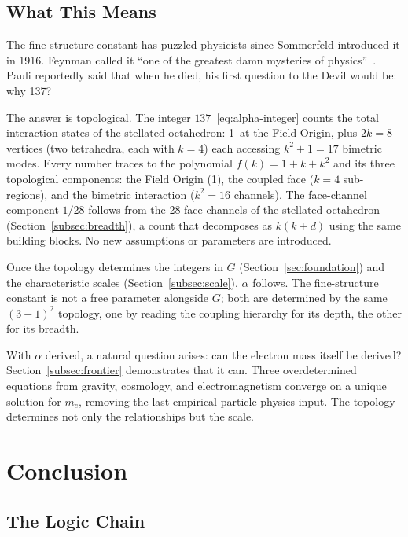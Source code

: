 \documentclass[aps,prd,preprint,superscriptaddress,showpacs,preprintnumbers,amsmath,amssymb,nofootinbib]{revtex4-2}
\begin{document}
\subsection{What This Means}
\label{subsec:alpha-meaning}

The fine-structure constant has puzzled physicists since Sommerfeld introduced it in 1916. Feynman called it ``one of the greatest damn mysteries of physics''~\cite{feynman1985}. Pauli reportedly said that when he died, his first question to the Devil would be: why 137?

The answer is topological. The integer $137$~\eqref{eq:alpha-integer} counts the total interaction states of the stellated octahedron: 1~at the Field Origin, plus $2k = 8$ vertices (two tetrahedra, each with $k = 4$) each accessing $k^2 + 1 = 17$ bimetric modes. Every number traces to the polynomial $f(k) = 1 + k + k^2$ and its three topological components: the Field Origin (1), the coupled face ($k = 4$ sub-regions), and the bimetric interaction ($k^2 = 16$ channels). The face-channel component $1/28$ follows from the 28 face-channels of the stellated octahedron (Section~\ref{subsec:breadth}), a count that decomposes as $k(k+d)$ using the same building blocks. No new assumptions or parameters are introduced.

Once the topology determines the integers in $G$ (Section~\ref{sec:foundation}) and the characteristic scales (Section~\ref{subsec:scale}), $\alpha$ follows. The fine-structure constant is not a free parameter alongside $G$; both are determined by the same $(3+1)^2$ topology, one by reading the coupling hierarchy for its depth, the other for its breadth.

With $\alpha$ derived, a natural question arises: can the electron mass itself be derived? Section~\ref{subsec:frontier} demonstrates that it can. Three overdetermined equations from gravity, cosmology, and electromagnetism converge on a unique solution for $m_e$, removing the last empirical particle-physics input. The topology determines not only the relationships but the scale.

\section{Conclusion}
\label{sec:conclusion}

\subsection{The Logic Chain}
\label{subsec:chain}
\end{document}
